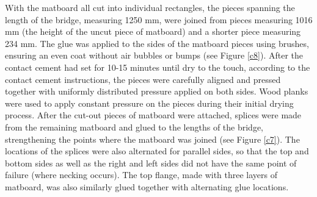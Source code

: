\documentclass[11pt]{article}
\begin{document}
With the matboard all cut into individual rectangles, the pieces spanning the length of the bridge, measuring 1250 mm, were joined from pieces measuring 1016 mm (the height of the uncut piece of matboard) and a shorter piece measuring 234 mm. The glue was applied to the sides of the matboard pieces using brushes, ensuring an even coat without air bubbles or bumps (see Figure \ref{c8}). After the contact cement had set for 10-15 minutes until dry to the touch, according to the contact cement instructions, the pieces were carefully aligned and pressed together with uniformly distributed pressure applied on both sides. Wood planks were used to apply constant pressure on the pieces during their initial drying process. After the cut-out pieces of matboard were attached, splices were made from the remaining matboard and glued to the lengths of the bridge, strengthening the points where the matboard was joined (see Figure \ref{c7}). The locations of the splices were also alternated for parallel sides, so that the top and bottom sides as well as the right and left sides did not have the same point of failure (where necking occurs). The top flange, made with three layers of matboard, was also similarly glued together with alternating glue locations.
\end{document}
